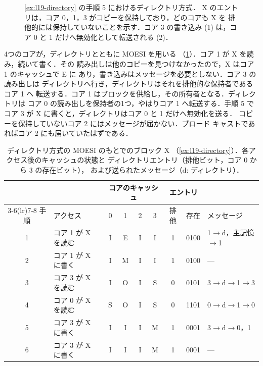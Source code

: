\documentclass[../main.tex]{subfiles}
\begin{document}
\begin{figure}[htbp]
  \centering
  \resizebox{\linewidth}{!}{}
  \caption{\cref{ex:l19-directory} の手順 5 におけるディレクトリ方式．
    X のエントリは，コア 0，1，3 がコピーを保持しており，どのコアも X を
    排他的には保持していないことを示す．コア 3 の書き込み (1) は，コア 0
    と 1 だけへ無効化として転送される (2)．}
  \label{fig:l19-directory}
\end{figure}

\begin{example}
  \label{ex:l19-directory}
  4つのコアが，ディレクトリとともに MOESI を用いる
  （\cref{tab:l19-directory}）．コア 1 が X を読み，続いて書く．その
  読み出しは他のコピーを見つけなかったので，X はコア 1 のキャッシュで E に
  あり，書き込みはメッセージを必要としない．コア 3 の読み出しは
  ディレクトリへ行き，ディレクトリはそれを排他的な保持者であるコア 1 へ
  転送する．コア 1 はブロックを供給し，その所有者となる．ディレクトリは
  コア 0 の読み出しを保持者の1つ，やはりコア 1 へ転送する．手順 5 で
  コア 3 が X に書くと，ディレクトリはコア 0 と 1 だけへ無効化を送る．
  コピーを保持していないコア 2 にはメッセージが届かない．ブロード
  キャストであればコア 2 にも届いていたはずである．
\end{example}

\begin{table}[htbp]
  \centering\small
  \caption{ディレクトリ方式の MOESI のもとでのブロック X
    （\cref{ex:l19-directory}）．各アクセス後のキャッシュの状態と
    ディレクトリエントリ（排他ビット，コア 0 から 3 の存在ビット），
    および送られたメッセージ（d: ディレクトリ）．}
  \label{tab:l19-directory}
  \setlength{\tabcolsep}{4pt}
  \begin{tabular}{@{}cl cccc cc l@{}}
    \toprule
    & & \multicolumn{4}{c}{コアのキャッシュ} & \multicolumn{2}{c}{エントリ} & \\
    \cmidrule(lr){3-6}\cmidrule(lr){7-8}
    手順 & アクセス & 0 & 1 & 2 & 3 & 排他 & 存在 & メッセージ \\
    \midrule
    1 & コア 1 が X を読む  & I & E & I & I & 1 & 0100 & 1$\to$d，主記憶$\to$1 \\
    2 & コア 1 が X に書く & I & M & I & I & 1 & 0100 & --- \\
    3 & コア 3 が X を読む  & I & O & I & S & 0 & 0101 & 3$\to$d$\to$1$\to$3 \\
    4 & コア 0 が X を読む  & S & O & I & S & 0 & 1101 & 0$\to$d$\to$1$\to$0 \\
    5 & コア 3 が X に書く & I & I & I & M & 1 & 0001 & 3$\to$d$\to$0，1 \\
    6 & コア 3 が X に書く & I & I & I & M & 1 & 0001 & --- \\
    \bottomrule
  \end{tabular}
\end{table}
\end{document}
